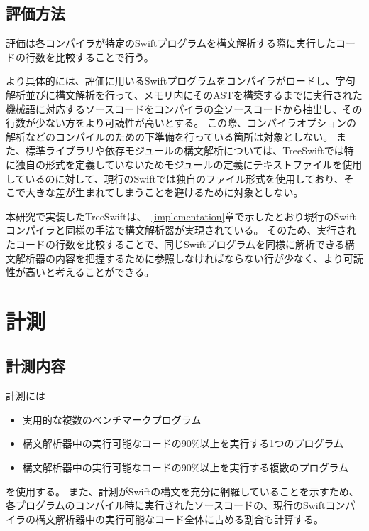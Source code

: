\subsection{評価方法}

評価は各コンパイラが特定のSwiftプログラムを構文解析する際に実行したコードの行数を比較することで行う。

より具体的には、評価に用いるSwiftプログラムをコンパイラがロードし、字句解析並びに構文解析を行って、メモリ内にそのASTを構築するまでに実行された機械語に対応するソースコードをコンパイラの全ソースコードから抽出し、その行数が少ない方をより可読性が高いとする。
この際、コンパイラオプションの解析などのコンパイルのための下準備を行っている箇所は対象としない。
また、標準ライブラリや依存モジュールの構文解析については、TreeSwiftでは特に独自の形式を定義していないためモジュールの定義にテキストファイルを使用しているのに対して、現行のSwiftでは独自のファイル形式を使用しており、そこで大きな差が生まれてしまうことを避けるために対象としない。

本研究で実装したTreeSwiftは、~\ref{implementation}章で示したとおり現行のSwiftコンパイラと同様の手法で構文解析器が実現されている。
そのため、実行されたコードの行数を比較することで、同じSwiftプログラムを同様に解析できる構文解析器の内容を把握するために参照しなければならない行が少なく、より可読性が高いと考えることができる。

\section{計測}

\subsection{計測内容}

計測には

\begin{itemize}
    \item 実用的な複数のベンチマークプログラム
    \item 構文解析器中の実行可能なコードの90\%以上を実行する1つのプログラム
    \item 構文解析器中の実行可能なコードの90\%以上を実行する複数のプログラム
\end{itemize}

を使用する。
また、計測がSwiftの構文を充分に網羅していることを示すため、各プログラムのコンパイル時に実行されたソースコードの、現行のSwiftコンパイラの構文解析器中の実行可能なコード全体に占める割合も計算する。

